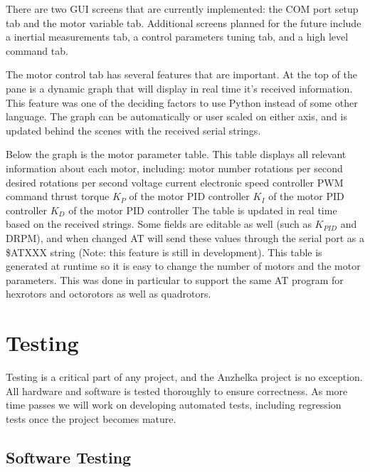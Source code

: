 \documentclass{article}
\numberwithin{equation}{section} %
\begin{document}
There are two GUI screens that are currently implemented: the COM port setup tab and the motor variable tab. Additional screens planned for the future include a inertial measurements tab, a control parameters tuning tab, and a high level command tab.

The motor control tab has several features that are important. At the top of the pane is a dynamic graph that will display in real time it's received information. This feature was one of the deciding factors to use Python instead of some other language. The graph can be automatically or user scaled on either axis, and is updated behind the scenes with the received serial strings.

Below the graph is the motor parameter table. This table displays all relevant information about each motor, including: 
motor number
rotations per second
desired rotations per second
voltage
current
electronic speed controller PWM command
thrust
torque
$K_P$ of the motor PID controller
$K_I$ of the motor PID controller
$K_D$ of the motor PID controller
The table is updated in real time based on the received strings. Some fields are editable as well (such as $K_{PID}$ and DRPM), and when changed AT will send these values through the serial port as a \$ATXXX string (Note: this feature is still in development). This table is generated at runtime so it is easy to change the number of motors and the motor parameters. This was done in particular to support the same AT program for hexrotors and octorotors as well as quadrotors.




\section{Testing}
Testing is a critical part of any project, and the Anzhelka project is no exception. All hardware and software is tested thoroughly to ensure correctness. As more time passes we will work on developing automated tests, including regression tests once the project becomes mature.

\subsection{Software Testing}
\end{document}

